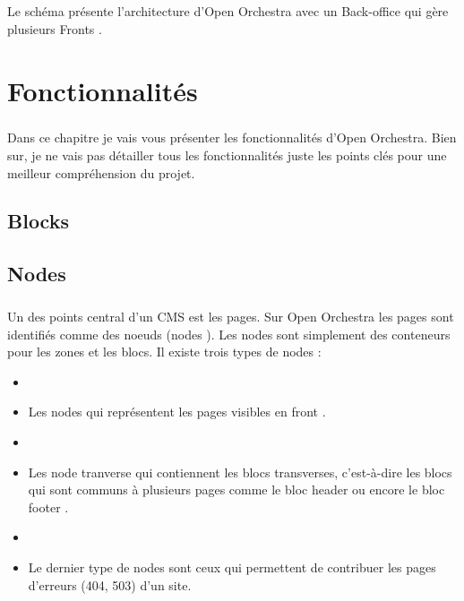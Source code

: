 	    \paragraph{}	
		Le schéma présente l'architecture d'Open Orchestra avec un \og Back-office \fg{} qui gère plusieurs \og Fronts \fg{}.
   
\chapter{Fonctionnalités}
	    \paragraph{}
	    Dans ce chapitre je vais vous présenter les fonctionnalités d'Open Orchestra. Bien sur, je ne vais pas détailler tous les fonctionnalités juste les points clés pour une meilleur compréhension du projet.
	      \section{Blocks}  
         \section{Nodes}
         \paragraph{}
         Un des points central d'un CMS est les pages. Sur Open Orchestra les pages sont identifiés comme des noeuds (\og nodes \fg{}).
          Les nodes sont simplement des conteneurs pour les zones et les blocs.
         Il existe trois types de nodes : 
         \begin{itemize}
         \item[]
         \item  Les nodes qui représentent les pages visibles en \og front \fg{}.
          \item[]
         \item  Les \og node tranverse \fg{} qui contiennent les blocs transverses, c'est-à-dire les blocs qui sont communs à plusieurs pages comme le bloc \og header \fg{} ou encore le bloc \og footer \fg{}.
          \item[]
         \item Le dernier type de nodes sont ceux qui permettent de contribuer les pages d'erreurs (404, 503) d'un site.
         \end{itemize}

